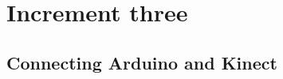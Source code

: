 \chapter{Increment three}
\label{chap:Increment three}

\section{Connecting Arduino and Kinect}
\label{sec:i3Connecting Arduino and Kinect}